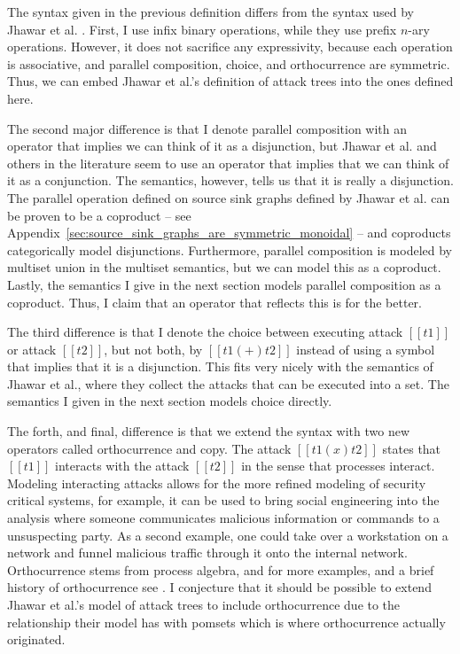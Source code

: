 \documentclass{llncs}
\begin{document}
The syntax given in the previous definition differs from the syntax
used by Jhawar et al. \cite{Jhawar:2015}.  First, I use infix binary
operations, while they use prefix $n$-ary operations. However, it does
not sacrifice any expressivity, because each operation is associative,
and parallel composition, choice, and orthocurrence are symmetric.
Thus, we can embed Jhawar et al.'s definition of attack trees into the
ones defined here.%

The second major difference is that I denote parallel composition with
an operator that implies we can think of it as a disjunction, but
Jhawar et al. and others in the literature seem to use an operator
that implies that we can think of it as a conjunction.  The semantics,
however, tells us that it is really a disjunction.  The parallel
operation defined on source sink graphs defined by Jhawar et
al. \cite{Jhawar:2015} can be proven to be a coproduct -- see
Appendix~\ref{sec:source_sink_graphs_are_symmetric_monoidal} -- and
coproducts categorically model disjunctions.  Furthermore, parallel
composition is modeled by multiset union in the multiset semantics,
but we can model this as a coproduct.  Lastly, the semantics I give in
the next section models parallel composition as a coproduct.  Thus, I
claim that an operator that reflects this is for the better.

The third difference is that I denote the choice between executing
attack $[[t1]]$ or attack $[[t2]]$, but not both, by $[[t1 (+) t2]]$
instead of using a symbol that implies that it is a disjunction.  This
fits very nicely with the semantics of Jhawar et al., where they
collect the attacks that can be executed into a set.  The semantics I
given in the next section models choice directly.

The forth, and final, difference is that we extend the syntax with two
new operators called orthocurrence and copy.  The attack $[[t1 (x)
    t2]]$ states that $[[t1]]$ interacts with the attack $[[t2]]$ in
the sense that processes interact.  Modeling interacting attacks
allows for the more refined modeling of security critical systems, for
example, it can be used to bring social engineering into the analysis
where someone communicates malicious information or commands to a
unsuspecting party.  As a second example, one could take over a
workstation on a network and funnel malicious traffic through it onto
the internal network.  Orthocurrence stems from process algebra, and
for more examples, and a brief history of orthocurrence see
\cite{Pratt:2001}.  I conjecture that it should be possible to extend
Jhawar et al.'s model of attack trees to include orthocurrence due to
the relationship their model has with pomsets which is where
orthocurrence actually originated.
\end{document}
